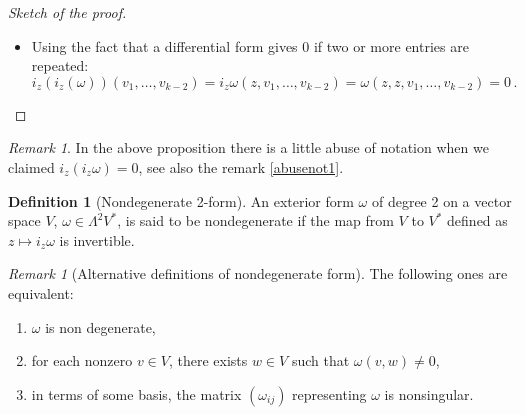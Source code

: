 \documentclass[a4paper,11pt,titlepage, article, oneside]{memoir}
\numberwithin{equation}{section}
\theoremstyle{definition}
\newtheorem{definition}[theorem]{Definition}
\theoremstyle{remark}
\newtheorem{remark}[theorem]{Remark}
\begin{document}
\begin{proof}[Sketch of the proof]
\begin{itemize}
\begin{enumerate}
\item $\sum\limits_{\substack{i_1 < \ldots < i_k \\ j_1 < \ldots < j_p }} (-1)^k a_{i_1 \cdots i_k} b_{j_1 \cdots j_p}  dx^{i_1} \wedge \ldots \wedge dx^{i_k}  \wedge i_z \left( dx^{j_1} \wedge \ldots \wedge dx^{j_p} \right)$ , for the same reason above, and we have the factor $(-1)^k$ because we moved the interior derivative $k$ times (it is like moving an entry of a $(k+p)$-form $k$ times), or
\item 0.
\end{enumerate}
Then, $i_z(\omega \wedge \eta)$ is the sum of these possible terms.
\item Using the fact that a differential form gives 0 if two or more entries are repeated:
$$i_z \left( i_z(\omega) \right) (v_1, \ldots, v_{k-2}) = i_z \omega (z, v_1, \ldots, v_{k-2}) = \omega (z, z, v_1, \ldots, v_{k-2}) = 0 \, .$$ \qedhere
\end{itemize}
\end{proof}

\begin{remarkbox}\begin{remark}
  In the above proposition there is a little abuse of notation when we claimed $i_z(i_z \omega) = 0$, see also the remark \ref{abusenot1}.
\end{remark}\end{remarkbox}

\begin{definition}[Nondegenerate 2-form]
An exterior form $\omega$ of degree 2 on a vector space $V$, $\omega \in \Lambda^2V^*$, is said to be nondegenerate if the map from $V$ to $V^*$ defined as $z \mapsto i_z \omega$ is invertible.
\end{definition}

\begin{remarkbox}\begin{remark}[Alternative definitions of nondegenerate form]
The following ones are equivalent:
\begin{enumerate}
\item $\omega$ is non degenerate,
\item for each nonzero $v \in V$, there exists $w \in V$ such that $\omega(v, w) \ne 0$,
\item in terms of some basis, the matrix $(\omega_{ij})$ representing $\omega$ is nonsingular.
\end{enumerate}

\end{remark}\end{remarkbox}
\end{document}
